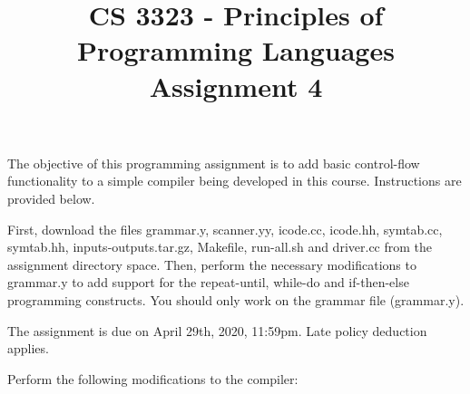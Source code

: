 \documentclass[letter,10pt]{article}
\title{CS 3323 - Principles of Programming Languages\\ Assignment 4}
\date{}
\begin{document}
\maketitle

The objective of this programming assignment is to add basic control-flow functionality 
to a simple compiler being developed in this course. Instructions are provided below.

First, download the files 
grammar.y, scanner.yy, icode.cc, icode.hh, symtab.cc, symtab.hh, inputs-outputs.tar.gz, Makefile, run-all.sh and driver.cc 
from the assignment directory space. 
Then, perform the necessary modifications
to grammar.y to add support for the repeat-until, while-do and if-then-else programming constructs. 
You should only work on the grammar file (grammar.y).

The assignment is due on April 29th, 2020, 11:59pm. Late policy deduction applies.

Perform the following modifications to the compiler:
\end{document}
